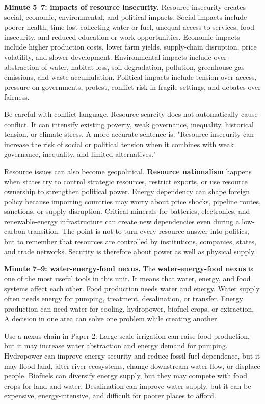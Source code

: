 \documentclass[11pt,a4paper]{article}
\newcommand{\term}[1]{\textcolor{HeadingBlue}{\textbf{#1}}}
\begin{document}
\textbf{Minute 5--7: impacts of resource insecurity.}
Resource insecurity creates social, economic, environmental, and political
impacts. Social impacts include poorer health, time lost collecting water or
fuel, unequal access to services, food insecurity, and reduced education or work
opportunities. Economic impacts include higher production costs, lower farm
yields, supply-chain disruption, price volatility, and slower development.
Environmental impacts include over-abstraction of water, habitat loss, soil
degradation, pollution, greenhouse gas emissions, and waste accumulation.
Political impacts include tension over access, pressure on governments, protest,
conflict risk in fragile settings, and debates over fairness.

Be careful with conflict language. Resource scarcity does not automatically
cause conflict. It can intensify existing poverty, weak governance, inequality,
historical tension, or climate stress. A more accurate sentence is: "Resource
insecurity can increase the risk of social or political tension when it combines
with weak governance, inequality, and limited alternatives."

Resource issues can also become geopolitical. \term{Resource nationalism}
happens when states try to control strategic resources, restrict exports, or use
resource ownership to strengthen political power. Energy dependency can shape
foreign policy because importing countries may worry about price shocks,
pipeline routes, sanctions, or supply disruption. Critical minerals for
batteries, electronics, and renewable-energy infrastructure can create new
dependencies even during a low-carbon transition. The point is not to turn every
resource answer into politics, but to remember that resources are controlled by
institutions, companies, states, and trade networks. Security is therefore about
power as well as physical supply.

\textbf{Minute 7--9: water-energy-food nexus.}
The \term{water-energy-food nexus} is one of the most useful tools in this unit.
It means that water, energy, and food systems affect each other. Food production
needs water and energy. Water supply often needs energy for pumping, treatment,
desalination, or transfer. Energy production can need water for cooling,
hydropower, biofuel crops, or extraction. A decision in one area can solve one
problem while creating another.

Use a nexus chain in Paper 2. Large-scale irrigation can raise food production,
but it may increase water abstraction and energy demand for pumping. Hydropower
can improve energy security and reduce fossil-fuel dependence, but it may flood
land, alter river ecosystems, change downstream water flow, or displace people.
Biofuels can diversify energy supply, but they may compete with food crops for
land and water. Desalination can improve water supply, but it can be expensive,
energy-intensive, and difficult for poorer places to afford.
\end{document}
